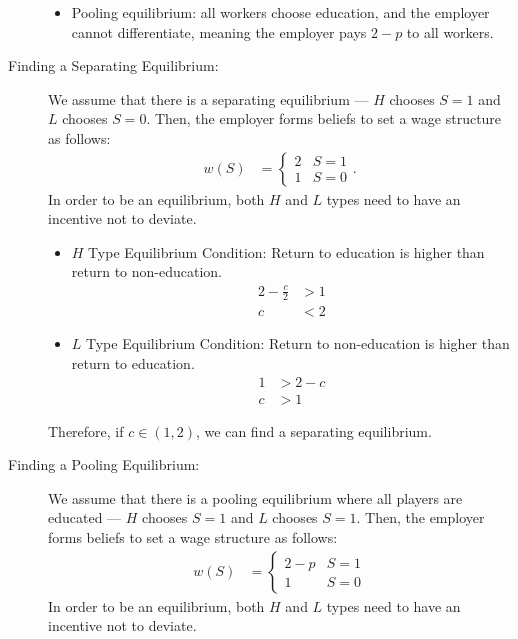 \documentclass[10pt]{extarticle}
\begin{document}
\begin{description}
\begin{itemize}
        \item Pooling equilibrium: all workers choose education, and the employer cannot differentiate, meaning the employer pays $2-p$ to all workers.
      \end{itemize}
    \item[Finding a Separating Equilibrium:] We assume that there is a separating equilibrium --- $H$ chooses $S=1$ and $L$ chooses $S=0$. Then, the employer forms beliefs to set a wage structure as follows:
      \begin{align*}
        w(S) &= \begin{cases}
          2 & S=1\\
          1 & S=0
        \end{cases}.
      \end{align*}
      In order to be an equilibrium, both $H$ and $L$ types need to have an incentive not to deviate.
      \begin{itemize}
        \item $H$ Type Equilibrium Condition: Return to education is higher than return to non-education.
          \begin{align*}
            2 - \frac{c}{2} &> 1\\
            c &< 2
          \end{align*}
        \item $L$ Type Equilibrium Condition: Return to non-education is higher than return to education.
          \begin{align*}
            1 &> 2-c\\
            c &> 1
          \end{align*}
      \end{itemize}
      Therefore, if $c\in (1,2)$, we can find a separating equilibrium.
    \item[Finding a Pooling Equilibrium:] We assume that there is a pooling equilibrium where all players are educated --- $H$ chooses $S = 1$ and $L$ chooses $S = 1$. Then, the employer forms beliefs to set a wage structure as follows:
      \begin{align*}
        w(S) &= \begin{cases}
          2-p & S = 1\\
          1 & S = 0
        \end{cases}
      \end{align*}
      In order to be an equilibrium, both $H$ and $L$ types need to have an incentive not to deviate.
      \begin{itemize}

\end{itemize}
\end{description}
\end{document}
